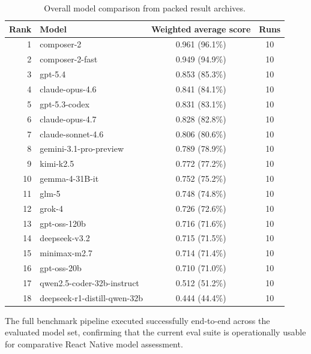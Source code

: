 \documentclass[11pt]{article}
\begin{document}
\begin{table}[htbp]
\centering
\small
\begin{tabular}{r l c c}
\toprule
\textbf{Rank} & \textbf{Model} & \textbf{Weighted average score} & \textbf{Runs} \\
\midrule
1  & composer-2                     & 0.961 (96.1\%) & 10 \\
2  & composer-2-fast                & 0.949 (94.9\%) & 10 \\
3  & gpt-5.4                        & 0.853 (85.3\%) & 10 \\
4  & claude-opus-4.6                & 0.841 (84.1\%) & 10 \\
5  & gpt-5.3-codex                  & 0.831 (83.1\%) & 10 \\
6  & claude-opus-4.7                & 0.828 (82.8\%) & 10 \\
7  & claude-sonnet-4.6              & 0.806 (80.6\%) & 10 \\
8  & gemini-3.1-pro-preview         & 0.789 (78.9\%) & 10 \\
9  & kimi-k2.5                      & 0.772 (77.2\%) & 10 \\
10 & gemma-4-31B-it                 & 0.752 (75.2\%) & 10 \\
11 & glm-5                          & 0.748 (74.8\%) & 10 \\
12 & grok-4                         & 0.726 (72.6\%) & 10 \\
13 & gpt-oss-120b                   & 0.716 (71.6\%) & 10 \\
14 & deepseek-v3.2                  & 0.715 (71.5\%) & 10 \\
15 & minimax-m2.7                   & 0.714 (71.4\%) & 10 \\
16 & gpt-oss-20b                    & 0.710 (71.0\%) & 10 \\
17 & qwen2.5-coder-32b-instruct     & 0.512 (51.2\%) & 10 \\
18 & deepseek-r1-distill-qwen-32b   & 0.444 (44.4\%) & 10 \\
\bottomrule
\end{tabular}
\caption{Overall model comparison from packed result archives.}
\label{tab:model-comparison-overall}
\end{table}



The full benchmark pipeline executed successfully end-to-end across the evaluated model set, confirming that the current eval suite is operationally usable for comparative React Native model assessment.
\end{document}
